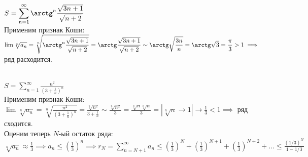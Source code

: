 \documentclass[a4paper]{article}
\begin{document}
    \begin{problem}
        \ \\
        $\displaystyle
        S = \sum\limits_{n=1}^{\infty}\arctg^n\frac{\sqrt{3n+1}}{\sqrt{n+2}}$\\[3pt]
        Применим признак Коши:\\[3pt]
        $\displaystyle\lim\sqrt[n]{a_n} = \sqrt[n]{\arctg^n\frac{\sqrt{3n+1}}{\sqrt{n+2}}} =
        \arctg\frac{\sqrt{3n+1}}{\sqrt{n+2}} \sim\arctg\sqrt{\frac{3n}{n}} =
        \arctg\sqrt{3}=\frac{\pi}{3} > 1 \implies
        $ ряд расходится.
    \end{problem}
    \begin{problem}
        \ \\
        $\displaystyle
        S = \sum\limits_{n=1}^{\infty}\frac{n^2}{\left(3+\frac{1}{n}\right)^n}$\\[3pt]
        Применим признак Коши:\\[3pt]
        $\displaystyle\lim\sqrt[n]{a_n} = \sqrt[n]{\frac{n^2}{\left(3+\frac{1}{n}\right)^n}} = \frac{\sqrt[n]{n^2}}{3 + \frac{1}{n}} \sim\frac{\sqrt[n]{n^2}}{3} =\frac{\sqrt[n]{n}\sqrt[n]{n}}{3} =
        \left|\sqrt[n]{n}\to 1\right| \to \frac{1}{3} < 1 \implies
        $ ряд сходится.\\[3pt]
        Оценим теперь $N$-ый остаток ряда:\\[3pt]
        $\displaystyle
        \sqrt[n]{a_n} \approx \frac{1}{3} \implies a_n \leq \left(\frac{1}{3}\right)^n
        \implies r_N = \sum\limits_{n = N + 1}^{\infty} a_n \leq
        \left(\frac{1}{3}\right)^{N} + \left(\frac{1}{3}\right)^{N + 1} + \left(\frac{1}{3}\right)^{N+2} + \ldots
        \leq\frac{(1/3)^N}{1 - 1/3}
        $
    \end{problem}
    
\end{document}
